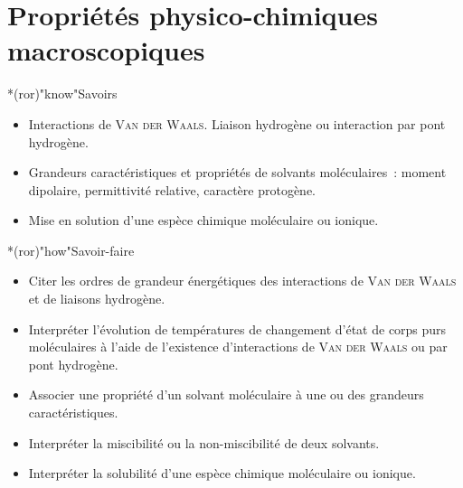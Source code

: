 \documentclass[../../main/main.tex]{subfiles}
\begin{document}
\setcounter{chapter}{1}

\chapter{Propri\'et\'es physico-chimiques macroscopiques}

\vspace*{\fill}
\begin{prgm}
	\begin{tcb}*(ror)"know"{Savoirs}
		\begin{itemize}
			\item Interactions de \textsc{Van der Waals}. Liaison hydrogène ou
			      interaction par pont hydrogène.
			\item Grandeurs caractéristiques et propriétés de solvants moléculaires~:
			      moment dipolaire, permittivité relative, caractère protogène.
			\item Mise en solution d'une espèce chimique moléculaire ou ionique.
		\end{itemize}
	\end{tcb}
	\begin{tcb}*(ror)"how"{Savoir-faire}
		\begin{itemize}
			\item Citer les ordres de grandeur énergétiques des interactions de
			      \textsc{Van der Waals} et de liaisons hydrogène.
			\item Interpréter l'évolution de températures de changement d'état de
			      corps purs moléculaires à l'aide de l'existence d'interactions de
			      \textsc{Van der Waals} ou par pont hydrogène.
			\item Associer une propriété d'un solvant moléculaire à une ou des
			      grandeurs caractéristiques.
			\item Interpréter la miscibilité ou la non-miscibilité de deux solvants.
			\item Interpréter la solubilité d'une espèce chimique moléculaire ou
			      ionique.
		\end{itemize}
	\end{tcb}
\end{prgm}



\vspace*{\fill}
\minitoc
\vspace*{\fill}
\end{document}
